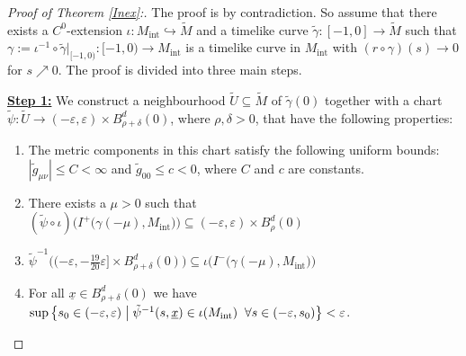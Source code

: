 \documentclass[reqno]{article}
\newcommand{\Mint}{M_{\mathrm{int}}}
\begin{document}
\begin{proof}[Proof of Theorem \ref{Inex}:]
The proof is by contradiction. So assume that there exists a $C^0$-extension $\iota : \Mint \hookrightarrow \tilde{M}$ and a timelike curve $\tilde{\gamma} : [-1,0] \to \tilde{M}$ such that $\gamma := \iota^{-1} \circ \tilde{\gamma}|_{[-1, 0)} : [-1, 0) \to \Mint$ is a timelike curve in $\Mint$ with $(r \circ \gamma)(s) \to 0$ for $s \nearrow 0$.
The proof is divided into three main steps.
\vspace*{2mm}

\underline{\textbf{Step 1:}} We construct a neighbourhood $\tilde{U} \subseteq \tilde{M}$ of $\tilde{\gamma}(0)$ together with a chart $\tilde{\psi} : \tilde{U} \to (-\varepsilon, \varepsilon) \times B^d_{\rho + \delta}(0)$, where $\rho, \delta >0$,  that have the following properties:
\begin{enumerate}
\item The metric components in this chart satisfy the following uniform bounds: $|\tilde{g}_{\mu \nu}| \leq C < \infty$ and $\tilde{g}_{00} \leq c < 0$, where $C$ and $c$ are constants.
\item There exists a $\mu >0$ such that $(\tilde{\psi} \circ \iota) \Big( I^+\big( \gamma(-\mu), \Mint\big)\Big) \subseteq (-\varepsilon, \varepsilon) \times B^d_\rho(0)$
\item $\tilde{\psi}^{-1}\Big(( - \varepsilon, - \frac{19}{20} \varepsilon] \times B^d_{\rho + \delta}(0)\Big) \subseteq \iota\Big(I^-\big(\gamma(-\mu), \Mint\big)\Big)$ 
\item For all $\underline{x} \in B^d_{\rho + \delta}(0)$ we have $\sup \big{\{} s_0 \in (-\varepsilon, \varepsilon) \; \big| \; \tilde{\psi}^{-1} (s,\underline{x}) \in \iota(\Mint) \;\; \forall  s \in (-\varepsilon, s_0)\big{\}} < \varepsilon$.
\end{enumerate}
\vspace*{2mm}





\end{proof}
\end{document}
